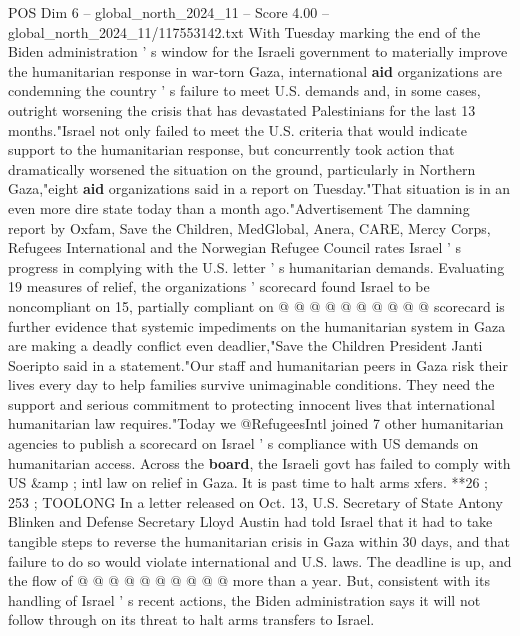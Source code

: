 \begin{textsample}{POS Dim 6 – global\_north\_2024\_11 – Score 4.00 – global\_north\_2024\_11/117553142.txt}  \label{ex:f6_pos_290}
With Tuesday marking the end of the Biden administration ' s window for the Israeli government to materially improve the humanitarian response in war-torn Gaza, international \textbf{aid} organizations are condemning the country ' s failure to meet U.S. demands and, in some cases, outright worsening the crisis that has devastated Palestinians for the last 13 months."Israel not only failed to meet the U.S. criteria that would indicate support to the humanitarian response, but concurrently took action that dramatically worsened the situation on the ground, particularly in Northern Gaza,"eight \textbf{aid} organizations said in a report on Tuesday."That situation is in an even more dire state today than a month ago."Advertisement The damning report by Oxfam, Save the Children, MedGlobal, Anera, CARE, Mercy Corps, Refugees International and the Norwegian Refugee Council rates Israel ' s progress in complying with the U.S. letter ' s humanitarian demands.
Evaluating 19 measures of relief, the organizations ' scorecard found Israel to be noncompliant on 15, partially compliant on @ @ @ @ @ @ @ @ @ @ scorecard is further evidence that systemic impediments on the humanitarian system in Gaza are making a deadly conflict even deadlier,"Save the Children President Janti Soeripto said in a statement."Our staff and humanitarian peers in Gaza risk their lives every day to help families survive unimaginable conditions.
They need the support and serious commitment to protecting innocent lives that international humanitarian law requires."Today we @RefugeesIntl joined 7 other humanitarian agencies to publish a scorecard on Israel ' s compliance with US demands on humanitarian access.
Across the \textbf{board}, the Israeli govt has failed to comply with US \&amp ; intl law on relief in Gaza.
It is past time to halt arms xfers. **26 ; 253 ; TOOLONG In a letter released on Oct. 13, U.S.
Secretary of State Antony Blinken and Defense Secretary Lloyd Austin had told Israel that it had to take tangible steps to reverse the humanitarian crisis in Gaza within 30 days, and that failure to do so would violate international and U.S. laws.
The deadline is up, and the flow of @ @ @ @ @ @ @ @ @ @ more than a year.
But, consistent with its handling of Israel ' s recent actions, the Biden administration says it will not follow through on its threat to halt arms transfers to Israel.

\end{textsample}
